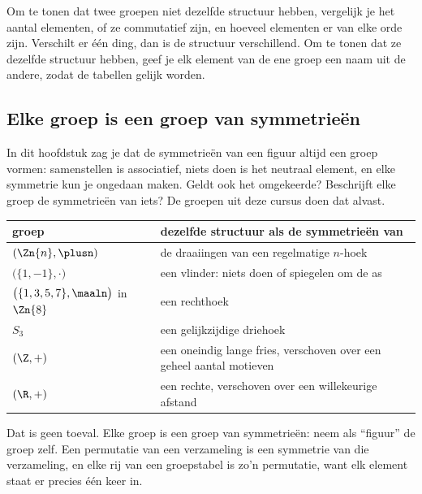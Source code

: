 \begin{werkwijze}
Om te tonen dat twee groepen niet dezelfde structuur hebben, vergelijk je het aantal elementen, of ze commutatief zijn, en hoeveel elementen er van elke orde zijn. Verschilt er één ding, dan is de structuur verschillend. Om te tonen dat ze dezelfde structuur hebben, geef je elk element van de ene groep een naam uit de andere, zodat de tabellen gelijk worden.
\end{werkwijze}

\begin{oefeningen}

\end{oefeningen}

\subsection{Elke groep is een groep van symmetrieën}

In dit hoofdstuk zag je dat de symmetrieën van een figuur altijd een groep vormen: samenstellen is associatief, niets doen is het neutraal element, en elke symmetrie kun je ongedaan maken. Geldt ook het omgekeerde? Beschrijft elke groep de symmetrieën van iets? De groepen uit deze cursus doen dat alvast.

\begin{center}
\renewcommand{\arraystretch}{1.3}
\begin{tabular}{|l|l|}
\hline
\rowcolor{accent!14} groep & dezelfde structuur als de symmetrieën van \\ \hline
$(\Zn{n}, \plusn)$ & de draaiingen van een regelmatige $n$-hoek \\ \hline
$\bigl(\{1, -1\}, \cdot\bigr)$ & een vlinder: niets doen of spiegelen om de as \\ \hline
$\bigl(\{1, 3, 5, 7\}, \maaln\bigr)$ in $\Zn{8}$ & een rechthoek \\ \hline
$S_3$ & een gelijkzijdige driehoek \\ \hline
$(\Z, +)$ & een oneindig lange fries, verschoven over een geheel aantal motieven \\ \hline
$(\R, +)$ & een rechte, verschoven over een willekeurige afstand \\ \hline
\end{tabular}
\end{center}

Dat is geen toeval. Elke groep is een groep van symmetrieën: neem als ``figuur'' de groep zelf. Een permutatie van een verzameling is een symmetrie van die verzameling, en elke rij van een groepstabel is zo'n permutatie, want elk element staat er precies één keer in.

